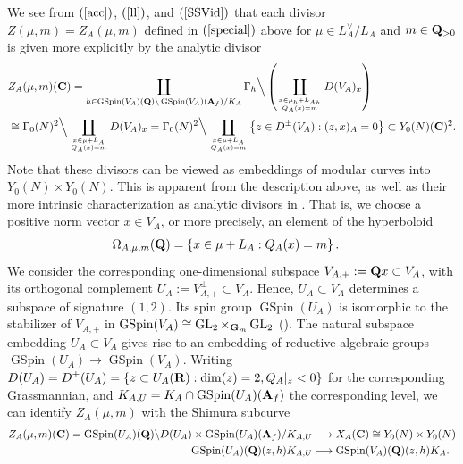 \documentclass{amsart}
\theoremstyle{definition}
\theoremstyle{definition}
\theoremstyle{definition}
\begin{document}
We see from $(\ref{acc})$, $(\ref{ll})$, and $(\ref{SSVid})$ that each divisor $Z(\mu, m) = Z_A(\mu, m)$ defined in 
$(\ref{special})$ above for $\mu \in L_A^{\vee}/L_A$ and $m \in {\bf{Q}}_{>0}$ is given more explicitly by the analytic divisor 
\begin{equation*}\begin{aligned} &Z_A(\mu, m)({\bf{C}}) 
= \coprod\limits_{ h \in \operatorname{GSpin}(V_A)({\bf{Q}}) \backslash \operatorname{GSpin}(V_A)({\bf{A}}_f) /K_A } \Gamma_h \Big\backslash
\left(  \coprod\limits_{ x \in \mu_h + {L_A}_h \atop Q_A(x) = m } D(V_A)_x \right) \\
&\cong \Gamma_0(N)^2 \Big\backslash \coprod\limits_{ x \in \mu + L_A \atop Q_A(x) = m } D(V_A)_x
= \Gamma_0(N)^2 \Big\backslash \coprod\limits_{ x \in \mu + L_A \atop Q_A(x) = m } \left\lbrace z \in D^{\pm}(V_A): (z, x)_A =0 \right\rbrace \subset Y_0(N)({\bf{C}})^2. \end{aligned}\end{equation*}
Note that these divisors can be viewed as embeddings of modular curves into $Y_0(N) \times Y_0(N)$.
This is apparent from the description above, as well as their more intrinsic characterization as analytic divisors in \cite[$\S$2]{KuAC}. 
That is, we choose a positive norm vector $x \in V_A$, or more precisely, an element of the hyperboloid 
\begin{align*} \Omega_{A, \mu, m}({\bf{Q}}) &= \left\lbrace x \in \mu + L_A: Q_A(x) =m \right\rbrace. \end{align*}
We consider the corresponding one-dimensional subspace 
$V_{A, +} := {\bf{Q}} x \subset V_A$, with its orthogonal complement $U_A := V_{A,+}^{\perp} \subset V_A$.
Hence, $U_A \subset V_A$ determines a subspace of signature $(1,2)$. 
Its spin group $\operatorname{GSpin}(U_A)$ is isomorphic  
to the stabilizer of $V_{A,+}$ in $\operatorname{GSpin}(V_A) \cong  \operatorname{GL}_2 \times_{{\bf{G}}_m} \operatorname{GL}_2$ (\cite[Lemma 2.1]{KuAC}).
The natural subspace embedding $U_A \subset V_A$ gives rise to an embedding of reductive algebraic groups
$\operatorname{GSpin}(U_A) \rightarrow \operatorname{GSpin}(V_A)$.
Writing $D(U_A) = D^{\pm}(U_A) = \left\lbrace z \subset U_A({\bf{R}}): \dim(z) = 2, Q_A\vert_z < 0 \right\rbrace$ for the 
corresponding Grassmannian, and $K_{A,U} = K_A \cap \operatorname{GSpin}(U_A)({\bf{A}}_f)$ the corresponding level, we can identify $Z_A(\mu, m)$ with the Shimura subcurve 
\begin{equation*}\begin{aligned} Z_A(\mu, m)({\bf{C}}) 
= \operatorname{GSpin}(U_A)({\bf{Q}}) \backslash D(U_A) \times \operatorname{GSpin}(U_A)({\bf{A}}_f) / K_{A,U} 
&\longrightarrow X_A({\bf{C}}) \cong Y_0(N) \times Y_0(N) \\
\operatorname{GSpin}(U_A)({\bf{Q}})(z, h) K_{A,U} &\longmapsto 
\operatorname{GSpin}(V_A)({\bf{Q}})(z, h) K_A. \end{aligned}\end{equation*}
\end{document}

